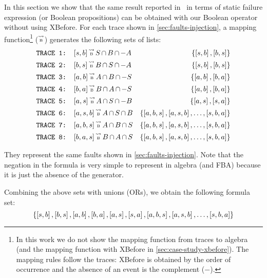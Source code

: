 \documentclass[12pt,openright,twoside,a4paper,oldfontcommands,english,brazil,draft]{abntex2}
\theoremstyle{theo}
\def\tracetobool{\ensuremath\operatorname{\stackrel{\leadsto}{\text{\tiny B}}}}
\newcommand{\setsin}[1]{\ensuremath\left\{ #1 \right\}}
\newcommand{\listsin}[1]{\ensuremath\left[ #1 \right]}
\def\inter{\ensuremath\operatorname{\cap}}
\begin{document}
In this section we show that the same result reported in~\cite{DM2012} in terms of static failure expression (or Boolean propositions) can be obtained with our Boolean operator without using XBefore.
For each trace shown in \cref{sec:faults-injection}, a mapping function\footnote{In this work we do not show the mapping function from traces to \ac{algebra} (and the mapping function with XBefore in \cref{sec:case-study-xbefore}).
The mapping rules follow the traces: XBefore is obtained by the order of occurrence and the absence of an event is the complement ($-$).} ($\tracetobool$) generates the following sets of lists:
%
\begin{align*}
\text{\texttt{TRACE 1: }}&[s,b] \tracetobool S \inter B \inter -A & \setsin{\listsin{s,b},\listsin{b,s}}\\
\text{\texttt{TRACE 2: }}&[b,s] \tracetobool B \inter S \inter -A & \setsin{\listsin{s,b},\listsin{b,s}}\\
\text{\texttt{TRACE 3: }}&[a,b] \tracetobool A \inter B \inter -S & \setsin{\listsin{a,b},\listsin{b,a}}\\
\text{\texttt{TRACE 4: }}&[b,a] \tracetobool B \inter A \inter -S & \setsin{\listsin{a,b},\listsin{b,a}}\\
\text{\texttt{TRACE 5: }}&[a,s] \tracetobool A \inter S \inter -B & \setsin{\listsin{a,s},\listsin{s,a}}\\
\text{\texttt{TRACE 6: }}&[a,s,b] \tracetobool A \inter S \inter B & \setsin{\listsin{a,b,s},\listsin{a,s,b},\ldots,\listsin{s,b,a}}\\
\text{\texttt{TRACE 7: }}&[a,b,s] \tracetobool A \inter B \inter S & \setsin{\listsin{a,b,s},\listsin{a,s,b},\ldots,\listsin{s,b,a}}\\
\text{\texttt{TRACE 8: }}&[b,a,s] \tracetobool B \inter A \inter S & \setsin{\listsin{a,b,s},\listsin{a,s,b},\ldots,\listsin{s,b,a}}\\
\end{align*}

They represent the same faults shown in \cref{sec:faults-injection}.
Note that the negation in the formula is very simple to represent in \ac{algebra} (and \ac{FBA}) because it is just the absence of the generator.

Combining the above sets with unions (ORs), we obtain the following formula set:
%
\[
\left\{ \listsin{s,b}, \listsin{b,s}, \listsin{a,b}, \listsin{b,a}, \listsin{a,s}, \listsin{s,a}, \listsin{a,b,s}, \listsin{a,s,b},\ldots,\listsin{s,b,a} \right\}
\]
\end{document}
